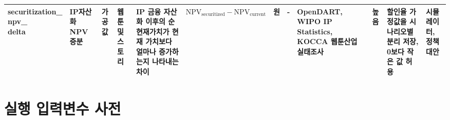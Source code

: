 \documentclass[11pt,a4paper]{report}
\newcommand{\WrapCell}[1]{\parbox[t]{\hsize}{\RaggedRight #1}}
\begin{document}
\begin{landscape}
\begin{longtable}{@{}L{2.0cm}L{1.8cm}L{0.8cm}L{1.7cm}L{2.8cm}L{3.5cm}L{1.0cm}L{0.8cm}L{2.7cm}L{1.2cm}L{2.7cm}L{1.8cm}@{}}
\WrapCell{securitization\_\\npv\_\\delta} & IP자산화 NPV 증분 & 가공값 & 웹툰 및 스토리 & IP 금융 자산화 이후의 순현재가치가 현재 가치보다 얼마나 증가하는지 나타내는 차이 & $\text{NPV}_{\mathrm{securitized}}-\text{NPV}_{\mathrm{current}}$ & 원 & - & OpenDART, WIPO IP Statistics, KOCCA 웹툰산업 실태조사 & 높음 & 할인율 가정값을 시나리오별 분리 저장, 0보다 작은 값 허용 & 시뮬레이터, 정책대안 \\
\bottomrule
\end{longtable}
\normalsize
\end{landscape}

\chapter{실행 입력변수 사전}
\begingroup
\footnotesize
\end{document}
